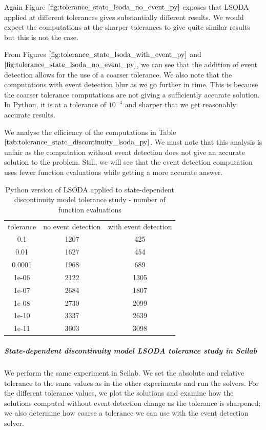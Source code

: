 Again Figure $\ref{fig:tolerance_state_lsoda_no_event_py}$ exposes that LSODA applied  at different tolerances gives substantially different results. We would expect the computations at the sharper tolerances to give quite similar results but this is not the case.

From Figures $\ref{fig:tolerance_state_lsoda_with_event_py}$ and $\ref{fig:tolerance_state_lsoda_no_event_py}$, we can see that the addition of event detection allows for the use of a coarser tolerance. We also note that the computations with event detection blur as we go further in time. This is because the coarser tolerance computations are not giving a sufficiently accurate solution. In Python, it is at a tolerance of $10^{-4}$ and sharper that we get reasonably accurate results. 

We analyse the efficiency of the computations in Table $\ref{tab:tolerance_state_discontinuity_lsoda_py}$. We must note that this analysis is unfair as the computation without event detection does not give an accurate solution to the problem. Still, we will see that the event detection computation uses fewer function evaluations while getting a more accurate answer.

\begin{table}[h]
\caption {Python version of LSODA applied to state-dependent discontinuity model tolerance study - number of function evaluations} \label{tab:tolerance_state_discontinuity_lsoda_py} 
\begin{center}
\begin{tabular}{ c c c }
tolerance & no event detection & with event detection \\
0.1 & 1207 & 425 \\
0.01 & 1627 & 454 \\
0.0001 & 1968 & 689 \\
1e-06 & 2122 & 1305 \\
1e-07 & 2684 & 1807 \\
1e-08 & 2730 & 2099 \\
1e-10 & 3337 & 2639 \\
1e-11 & 3603 & 3098 \\
\end{tabular}
\end{center}
\end{table}

\subparagraph{State-dependent discontinuity model LSODA tolerance study in Scilab}

We perform the same experiment in Scilab. We set the absolute and relative tolerance to the same values as in the other experiments and run the solvers. For the different tolerance values, we plot the solutions and examine how the solutions computed without event detection change as the tolerance is sharpened; we also determine how coarse a tolerance we can use with the event detection solver.

